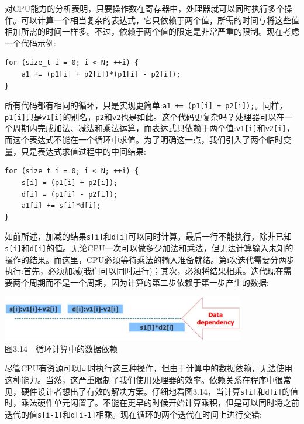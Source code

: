 对CPU能力的分析表明，只要操作数在寄存器中，处理器就可以同时执行多个操作。可以计算一个相当复杂的表达式，它只依赖于两个值，所需的时间与将这些值相加所需的时间一样多。不过，依赖于两个值的限定是非常严重的限制。现在考虑一个代码示例:

\begin{lstlisting}[style=styleCXX]
for (size_t i = 0; i < N; ++i) {
	a1 += (p1[i] + p2[i])*(p1[i] - p2[i]);
}
\end{lstlisting}

所有代码都有相同的循环，只是实现更简单:\texttt{a1 += (p1[i] + p2[i]);}。同样，\texttt{p1[i]}只是\texttt{v1[i]}的别名，\texttt{p2}和\texttt{v2}也是如此。这个代码更复杂吗？处理器可以在一个周期内完成加法、减法和乘法运算，而表达式只依赖于两个值:\texttt{v1[i]}和\texttt{v2[i]}，而这个表达式不能在一个循环中求值。为了明确这一点，我们引入了两个临时变量，只是表达式求值过程中的中间结果:

\begin{lstlisting}[style=styleCXX]
for (size_t i = 0; i < N; ++i) {
	s[i] = (p1[i] + p2[i]);
	d[i] = (p1[i] - p2[i]);
	a1[i] += s[i]*d[i];
}
\end{lstlisting}

如前所述，加减的结果\texttt{s[i]}和\texttt{d[i]}可以同时计算。最后一行不能执行，除非已知\texttt{s[i]}和\texttt{d[i]}的值。无论CPU一次可以做多少加法和乘法，但无法计算输入未知的操作的结果。而这里，CPU必须等待乘法的输入准备就绪。第i次迭代需要分两步执行:首先，必须加减(我们可以同时进行)；其次，必须将结果相乘。迭代现在需要两个周期而不是一个周期，因为计算的第二步依赖于第一步产生的数据:

\begin{center}
\includegraphics[width=0.8\textwidth]{content/1/chapter3/images/14.jpg}\\
图3.14 - 循环计算中的数据依赖
\end{center}

尽管CPU有资源可以同时执行这三种操作，但由于计算中的数据依赖，无法使用这种能力。当然，这严重限制了我们使用处理器的效率。依赖关系在程序中很常见，硬件设计者想出了有效的解决方案。仔细地看图3.14，当计算\texttt{s[i]}和\texttt{d[i]}的值时，乘法硬件单元闲置了。不能在更早的时候开始计算乘积，但是可以同时将之前迭代的值\texttt{s[i-1]}和\texttt{d[i-1]}相乘。现在循环的两个迭代在时间上进行交错:

